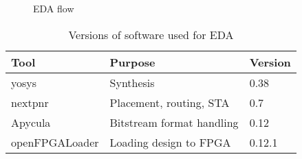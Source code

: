 \begin{figure}
  \begin{center}
  
  \end{center}
  \caption{EDA flow}
  \label{fig:eda-flow}
\end{figure}

\begin{table}
\centering
\begin{tabular}{lll}
  \toprule
  Tool           & Purpose                       & Version \\
  \midrule
  yosys          & Synthesis                     & 0.38    \\
  nextpnr        & Placement, routing, \gls{STA} & 0.7     \\
  Apycula        & Bitstream format handling     & 0.12    \\
  openFPGALoader & Loading design to FPGA        & 0.12.1  \\
  \bottomrule
\end{tabular}
\caption{Versions of software used for EDA}
\label{tab:tool-versions}  
\end{table}
